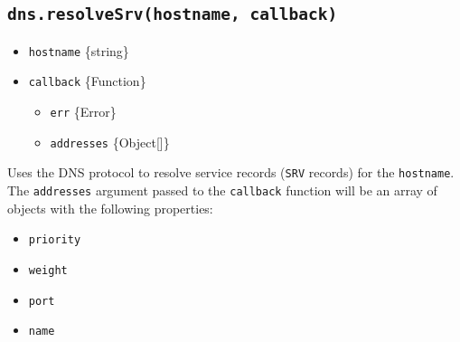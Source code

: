 \begin{Shaded}
\begin{Highlighting}[]
\NormalTok{\{}
  \OperatorTok{:} \OperatorTok{,}
  \OperatorTok{:} \OperatorTok{,}
  \OperatorTok{:} \OperatorTok{,}
  \OperatorTok{:} \OperatorTok{,}
  \OperatorTok{:} \OperatorTok{,}
  \OperatorTok{:} \OperatorTok{,}
  \OperatorTok{:} 
\NormalTok{\}}
\end{Highlighting}
\end{Shaded}

\subsection{\texorpdfstring{\texttt{dns.resolveSrv(hostname,\ callback)}}{dns.resolveSrv(hostname, callback)}}\label{dns.resolvesrvhostname-callback}

\begin{itemize}
\tightlist
\item
  \texttt{hostname} \{string\}
\item
  \texttt{callback} \{Function\}

  \begin{itemize}
  \tightlist
  \item
    \texttt{err} \{Error\}
  \item
    \texttt{addresses} \{Object{[}{]}\}
  \end{itemize}
\end{itemize}

Uses the DNS protocol to resolve service records (\texttt{SRV} records)
for the \texttt{hostname}. The \texttt{addresses} argument passed to the
\texttt{callback} function will be an array of objects with the
following properties:

\begin{itemize}
\tightlist
\item
  \texttt{priority}
\item
  \texttt{weight}
\item
  \texttt{port}
\item
  \texttt{name}
\end{itemize}

\begin{Shaded}
\begin{Highlighting}[]
\NormalTok{\{}
  \OperatorTok{:} \OperatorTok{,}
  \OperatorTok{:} \OperatorTok{,}
  \OperatorTok{:} \OperatorTok{,}
  \OperatorTok{:} 
\NormalTok{\}}
\end{Highlighting}
\end{Shaded}

